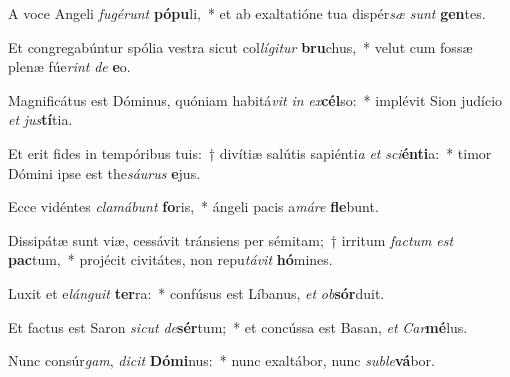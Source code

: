 \item A voce Angeli \textit{fu}\textit{gé}\textit{runt} \textbf{pó}\textbf{pu}li,~* et ab exaltatióne tua dispér\textit{sæ} \textit{sunt} \textbf{gen}tes.
\item Et congregabúntur spólia vestra sicut col\textit{lí}\textit{gi}\textit{tur} \textbf{bru}chus,~* velut cum fossæ plenæ fúe\textit{rint} \textit{de} \textbf{e}o.
\item Magnificátus est Dóminus, quóniam habitá\textit{vit} \textit{in} \textit{ex}\textbf{cél}so:~* implévit Sion judício \textit{et} \textit{jus}\textbf{tí}tia.
\item Et erit fides in tempóribus tuis:~† divítiæ salútis sapiénti\textit{a} \textit{et} \textit{sci}\textbf{én}\textbf{ti}a:~* timor Dómini ipse est the\textit{sáu}\textit{rus} \textbf{e}jus.
\item Ecce vidéntes \textit{cla}\textit{má}\textit{bunt} \textbf{fo}ris,~* ángeli pacis a\textit{má}\textit{re} \textbf{fle}bunt.
\item Dissipátæ sunt viæ, cessávit tránsiens per sémitam;~† irritum \textit{fac}\textit{tum} \textit{est} \textbf{pac}tum,~* projécit civitátes, non repu\textit{tá}\textit{vit} \textbf{hó}mines.
\item Luxit et e\textit{lán}\textit{gu}\textit{it} \textbf{ter}ra:~* confúsus est Líbanus, \textit{et} \textit{ob}\textbf{sór}duit.
\item Et factus est Saron \textit{sic}\textit{ut} \textit{de}\textbf{sér}tum;~* et concússa est Basan, \textit{et} \textit{Car}\textbf{mé}lus.
\item Nunc consúr\textit{gam}, \textit{di}\textit{cit} \textbf{Dó}\textbf{mi}nus:~* nunc exaltábor, nunc \textit{sub}\textit{le}\textbf{vá}bor.

